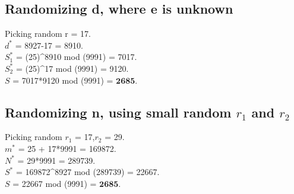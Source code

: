 \documentclass[11pt, pdftex]{article}
\begin{document}
\subsection{Randomizing d, where e is unknown}
Picking random r = 17.\\
$d^{*}$ = 8927-17 = 8910.\\
$S_{1}^{*}$ = (25)^{8910} mod (9991) = 7017. \\
$S_{2}^{*}$ = (25)^{17} mod (9991) = 9120. \\
$S$ = 7017*9120 mod (9991) = $\textbf{2685}$. 
\subsection{Randomizing n, using small random $r_{1}$ and $r_{2}$}
Picking random $r_{1}$ = 17,$r_{2}$ = 29.\\
$m^{*}$ = 25 + 17*9991 = 169872.\\
$N^{*}$ = 29*9991 = 289739.\\
$S^{*}$ = 169872^{8927} mod (289739) = 22667.\\
$S$ = 22667 mod (9991) = $\textbf{2685}$.
\end{document}
